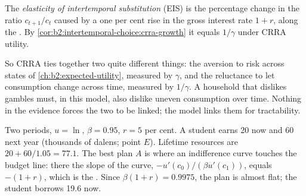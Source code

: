 \begin{definition}\label{def:b2:intertemporal-choice:eis}
The \emph{elasticity of intertemporal substitution}
(EIS) is the percentage change in the ratio $c_{t+1}/c_t$ caused by a one per cent rise in the gross
interest rate $1 + r$, along the . By \cref{cor:b2:intertemporal-choice:crra-growth} it
equals $1/\gamma$ under CRRA utility.
\end{definition}

So CRRA ties together two quite different things: the aversion to risk across states of
\cref{ch:b2:expected-utility}, measured by $\gamma$, and the reluctance to let consumption change
across time, measured by $1/\gamma$. A household that dislikes gambles must, in this model, also
dislike uneven consumption over time. Nothing in the evidence forces the two to be linked; the model
links them for tractability.

\begin{omfigure}

{\small Two periods, $u = \ln$, $\beta = 0.95$, $r = 5$ per cent. A student earns 20 now and 60 next
year (thousands of dalens; point $E$). Lifetime resources are $20 + 60/1.05 = 77.1$. The best plan
$A$ is where an indifference curve touches the budget line: there the slope of the curve,
$-u'(c_0)/(\beta u'(c_1))$, equals $-(1 + r)$, which is the . Since $\beta(1 + r) =
0.9975$, the plan is almost flat; the student borrows 19.6 now.}
\end{omfigure}

